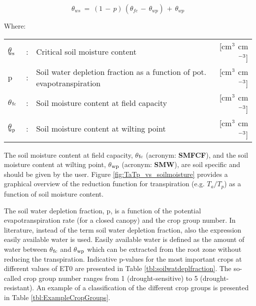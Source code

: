\begin{equation}
\label{eq:6.9}
\theta_{ws} ~=~ (1\, -\, p )\, (\theta_{fc} \, -\, \theta_{wp} )\, +\, \theta_{wp} 
\end{equation}

Where:\\[5pt]
\begin{tabularx}{\textwidth}{llXr}
	$\theta$$_{{\rm ws}}$ &:& Critical soil moisture content & [cm$^{{\rm 3}}$ cm$^{{\rm -3}}$]\\
	p &:& Soil water depletion fraction as a function 
	of pot. evapotranspiration & [cm$^{{\rm 3}}$ cm$^{{\rm -3}}$]\\
	$\theta$$_{{\rm fc}}$ &:& Soil moisture content at field capacity & [cm$^{{\rm 3}}$ cm$^{{\rm -3}}$]\\
	$\theta$$_{{\rm wp}}$ &:& Soil moisture content at wilting point & [cm$^{{\rm 3}}$ cm$^{{\rm -3}}$]\\
\end{tabularx}

The soil moisture content at field capacity, {\bf $\theta$$_{{\rm fc}}$} (acronym: {\bf SMFCF}), 
and the soil moisture content at wilting point, {\bf $\theta$$_{{\rm wp}}$} (acronym: {\bf SMW}), 
are soil specific and should be given by the user. Figure \ref{fig:TaTp_vs_soilmoisture} provides
a graphical overview of the reduction function for transpiration (e.g. $T_a/T_p$) as a 
function of soil moisture content.

The soil water depletion fraction, p, is a function of the potential evapotranspiration rate (for a closed canopy) and the crop group number.  In literature, instead of the term soil water depletion fraction, also the expression easily available water is used. Easily available water is defined as the amount of
water between $\theta$$_{{\rm fc}}$ and $\theta$$_{{\rm wp}}$ which can be extracted from the root 
zone without reducing the transpiration. Indicative p-values for the most important crops at different values of ET0 are presented in Table \ref{tbl:soilwatdeplfraction}. The so-called crop group number ranges from 1 (drought-sensitive) to 5 (drought-resistant). An example of a classification of the different crop groups is presented in Table \ref{tbl:ExampleCropGroups}.

